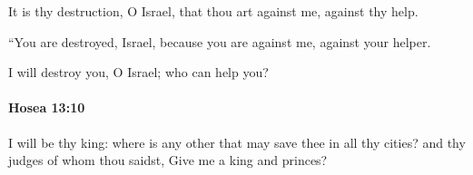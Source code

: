 			\begin{versebox}
					\item[BHS] 
					\item[LXX] 
					\item[ASV] It is thy destruction, O Israel, that thou art against me, against thy help.
					\item[NIV] “You are destroyed, Israel, because you are against me, against your helper.
					\item[NRSV] I will destroy you, O Israel; who can help you?
			\end{versebox}

		\paragraph{Hosea 13:10} %
			\label{HOSEA-13-10}

			I will be thy king: where is any other that may save thee in all thy cities? and thy judges of whom thou saidst, Give me a king and princes?

